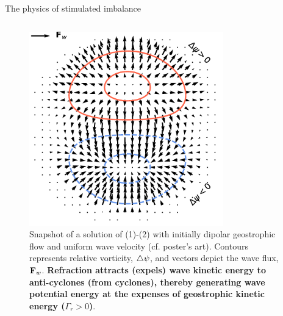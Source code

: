 \documentclass[final]{beamer}
\begin{document}
\begin{frame}[t]
\begin{columns}[t]
\begin{column}{0.425\paperwidth}
{\begin{alertblock}{The physics of stimulated imbalance}
                \begin{columns}
                  \begin{column}{.425\textwidth}
                  \begin{figure}
                    \includegraphics[width=0.75\textwidth]{figs/Gamma_r.pdf}
                    \caption{Snapshot of a solution of (1)-(2) with initially dipolar
                              geostrophic flow and uniform wave velocity
                              (cf. poster's art). Contours represents relative vorticity, $\triangle\psi$,
                              and vectors depict the wave flux, $\mathbf{F}_w$.
                              \textbf{Refraction attracts (expels)
                              wave kinetic energy to anti-cyclones (from cyclones),
                              thereby generating wave potential energy at the expenses
                              of geostrophic kinetic energy ($\Gamma_r>0$)}.
                              }
                  \end{figure}
                \end{column}


\end{columns}
\end{alertblock}}
\end{column}
\end{columns}
\end{frame}
\end{document}
